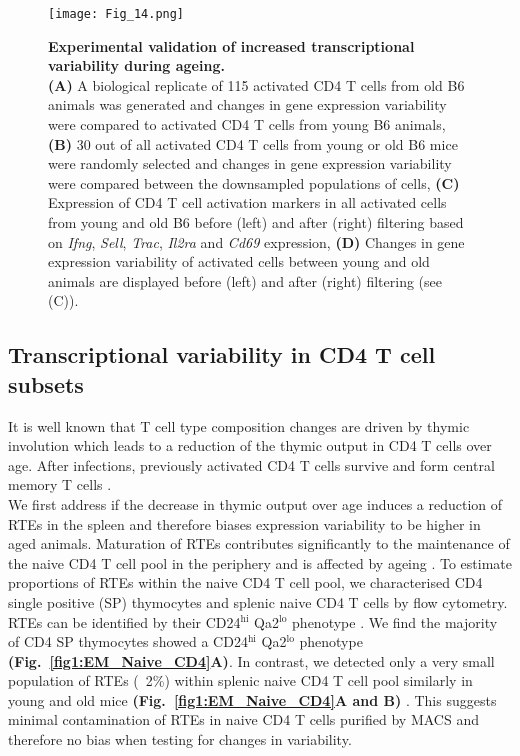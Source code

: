 \newpage

\begin{figure}[!ht]
\centering
\texttt{[image: Fig\_14.png]}
\caption[Experimental validation of increased transcriptional variability during ageing]{\textbf{Experimental validation of increased transcriptional variability during ageing.} \\
\textbf{(A)} A biological replicate of 115 activated CD4\plus{} T cells from old B6 animals was generated and changes in gene expression variability were compared to activated CD4\plus{} T cells from young B6 animals, \textbf{(B)} 30 out of all activated CD4\plus{} T cells from young or old B6 mice were randomly selected and changes in gene expression variability were compared between the downsampled populations of cells, \textbf{(C)} Expression of CD4\plus{} T cell activation markers in all activated cells from young and old B6 before (left) and after (right) filtering based on \textit{Ifng}, \textit{Sell}, \textit{Trac}, \textit{Il2ra} and \textit{Cd69} expression, \textbf{(D)} Changes in gene expression variability of activated cells between young and old animals are displayed before (left) and after (right) filtering (see (C)).}
\label{fig1:validation}
\end{figure}

\newpage

\subsection{Transcriptional variability in CD4\plus{} T cell subsets}

It is well known that T cell type composition changes are driven by thymic involution which leads to a reduction of the thymic output in CD4\plus{} T cells over age. After infections, previously activated CD4\plus{} T cells survive and form central memory T cells \cite{Moro-Garcia2013}.\\

We first address if the decrease in thymic output over age induces a reduction of \glspl{RTE} in the spleen and therefore biases expression variability to be higher in aged animals. Maturation of RTEs contributes significantly to the maintenance of the naive CD4\plus{} T cell pool in the periphery and is affected by ageing \citep{Boursalian2004, Hale2006, Fink2013}. To estimate proportions of RTEs within the naive CD4\plus{} T cell pool, we characterised CD4 single positive (SP) thymocytes and splenic naive CD4\plus{} T cells by flow cytometry. RTEs can be identified by their CD24$^{\text{hi}}$ Qa2$^{\text{lo}}$ phenotype \citep{Boursalian2004, Hale2006}. We find the  majority of CD4 SP thymocytes showed a CD24$^\text{hi}$ Qa2$^\text{lo}$ phenotype \textbf{(Fig.~\ref{fig1:EM_Naive_CD4}A)}. In contrast, we detected only a very small population of RTEs (~2\%) within splenic naive CD4\plus{} T cell pool similarly in young and old mice \textbf{(Fig.~\ref{fig1:EM_Naive_CD4}A and B)} \citep{Hale2006}. This suggests minimal contamination of RTEs in naive CD4\plus{} T cells purified by MACS and therefore no bias when testing for changes in variability.\\

